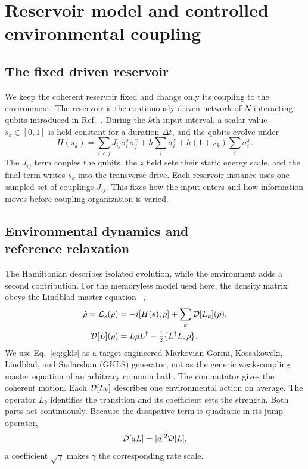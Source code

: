 \section{\texorpdfstring{Reservoir model and controlled\\
environmental coupling}{Reservoir model and controlled environmental coupling}}
\label{sec:model}

\subsection{The fixed driven reservoir}

We keep the coherent reservoir fixed and change only its coupling to the
environment.
The reservoir is the continuously driven network of \(N\) interacting qubits
introduced in Ref.~\cite{Sannia2024}. During the \(k\)th input interval, a
scalar value \(s_k\in[0,1]\) is held constant for a duration \(\Delta t\), and
the qubits evolve under
\begin{equation*}
H(s_k)=\sum_{i<j}J_{ij}\sigma_i^x\sigma_j^x
       +h\sum_i\sigma_i^z+h(1+s_k)\sum_i\sigma_i^x .
\end{equation*}
The \(J_{ij}\) term couples the qubits, the \(z\) field sets their static
energy scale, and the final term writes \(s_k\) into the transverse drive.
Each reservoir instance uses one sampled set of couplings \(J_{ij}\).
This fixes how the input enters and how information moves before coupling
organization is varied.

\subsection{\texorpdfstring{Environmental dynamics and\\
reference relaxation}{Environmental dynamics and reference relaxation}}

The Hamiltonian describes isolated evolution, while the environment adds a
second contribution. For the memoryless model used here, the density matrix
obeys the Lindblad master equation
~\cite{Gorini1976,Lindblad1976,BreuerPetruccione2002},
\begin{equation}
\begin{aligned}
\dot{\rho}=\mathcal{L}_s(\rho)
 &=-i[H(s),\rho]+\sum_k\mathcal{D}[L_k](\rho),\\
\mathcal{D}[L](\rho)
 &=L\rho L^\dagger-\tfrac12\{L^\dagger L,\rho\}.
\end{aligned}
\label{eq:gkls}
\end{equation}
We use Eq.~\eqref{eq:gkls} as a target engineered Markovian Gorini,
Kossakowski, Lindblad, and Sudarshan (GKLS) generator,
not as the generic weak-coupling master equation of an arbitrary common bath.
The commutator gives the coherent motion. Each \(\mathcal{D}[L_k]\) describes one
environmental action on average. The operator \(L_k\) identifies the
transition and its coefficient sets the strength. Both parts act continuously.
Because the dissipative term is quadratic in its jump operator,
\[
\mathcal{D}[aL]=\lvert a\rvert^2\mathcal{D}[L],
\]
a coefficient \(\sqrt{\gamma}\) makes \(\gamma\) the corresponding rate
scale.

